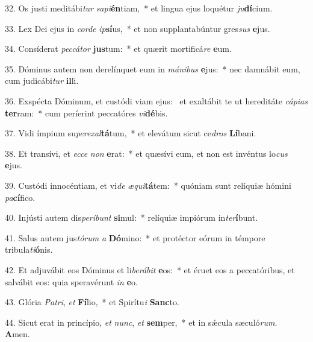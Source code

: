 32. Os justi meditábi\textit{tur} \textit{sa}\textit{pi}\textbf{én}tiam,~*  et lingua ejus loquétur \textit{ju}\textbf{dí}cium.\

33. Lex Dei ejus in \textit{cor}\textit{de} \textit{ip}\textbf{sí}us,~*  et non supplantabúntur gres\textit{sus} \textbf{e}jus.\

34. Consíderat \textit{pec}\textit{cá}\textit{tor} \textbf{jus}tum:~*  et quærit mortificá\textit{re} \textbf{e}um.\

35. Dóminus autem non derelínquet eum in \textit{má}\textit{ni}\textit{bus} \textbf{e}jus:~*  nec damnábit eum, cum judicábi\textit{tur} \textbf{il}li.\

36. Exspécta Dóminum, et custódi viam ejus: \dag\  et exaltábit te ut hereditáte \textit{cá}\textit{pi}\textit{as} \textbf{ter}ram:~*  cum períerint peccatóres \textit{vi}\textbf{dé}bis.\

37. Vidi ímpium su\textit{per}\textit{ex}\textit{al}\textbf{tá}tum,~*  et elevátum sicut ce\textit{dros} \textbf{Lí}bani.\

38. Et transívi, et \textit{ec}\textit{ce} \textit{non} \textbf{e}rat:~*  et quæsívi eum, et non est invéntus lo\textit{cus} \textbf{e}jus.\

39. Custódi innocéntiam, et vi\textit{de} \textit{æ}\textit{qui}\textbf{tá}tem:~*  quóniam sunt relíquiæ hómini \textit{pa}\textbf{cí}fico.\

40. Injústi autem dis\textit{per}\textit{í}\textit{bunt} \textbf{si}mul:~*  relíquiæ impiórum in\textit{ter}\textbf{í}bunt.\

41. Salus autem jus\textit{tó}\textit{rum} \textit{a} \textbf{Dó}mino:~*  et protéctor eórum in témpore tribula\textit{ti}\textbf{ó}nis.\

42. Et adjuvábit eos Dóminus et li\textit{be}\textit{rá}\textit{bit} \textbf{e}os:~*  et éruet eos a peccatóribus, et salvábit eos: quia speravérunt \textit{in} \textbf{e}o.\

43. Glória \textit{Pa}\textit{tri}, \textit{et} \textbf{Fí}lio,~*  et Spirítu\textit{i} \textbf{Sanc}to.\

44. Sicut erat in princípio, \textit{et} \textit{nunc}, \textit{et} \textbf{sem}per,~*  et in sǽcula sæculó\textit{rum}. \textbf{A}men.\

